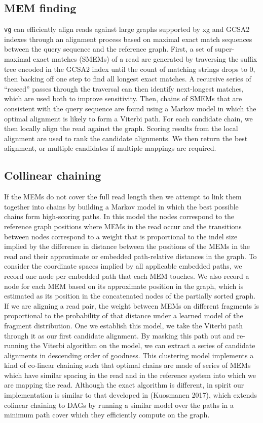 \subsection{MEM finding}
{\tt vg} can efficiently align reads against large graphs supported by xg and GCSA2 indexes through an alignment process based on maximal exact match sequences between the query sequence and the reference graph.
First, a set of super-maximal exact matches (SMEMs) of a read are generated by traversing the suffix tree encoded in the GCSA2 index until the count of matching strings drops to 0, then backing off one step to find all longest exact matches. 
A recursive series of ``reseed'' passes through the traversal can then identify next-longest matches, which are used both to improve sensitivity. 
Then, chains of SMEMs that are consistent with the query sequence are found using a Markov model in which the optimal alignment is likely to form a Viterbi path.
For each candidate chain, we then locally align the read against the graph. 
Scoring results from the local alignment are used to rank the candidate alignments.
We then return the best alignment, or multiple candidates if multiple mappings are required.

\subsection{Collinear chaining}

If the MEMs do not cover the full read length then we attempt to link them together into chains by building a Markov model in which the best possible chains form high-scoring paths. 
In this model the nodes correspond to the reference graph positions where MEMs in the read occur and the transitions between nodes correspond to a weight that is proportional to the indel size implied by the difference in distance between the positions of the MEMs in the read and their approximate or embedded path-relative distances in the graph. 
To consider the coordinate spaces implied by all applicable embedded paths, we record one node per embedded path that each MEM touches. 
We also record a node for each MEM based on its approximate position in the graph, which is estimated as its position in the concatenated nodes of the partially sorted graph. 
If we are aligning a read pair, the weight between MEMs on different fragments is proportional to the probability of that distance under a learned model of the fragment distribution. 
One we establish this model, we take the Viterbi path through it as our first candidate alignment. 
By masking this path out and re-running the Viterbi algorithm on the model, we can extract a series of candidate alignments in descending order of goodness. 
This clustering model implements a kind of co-linear chaining such that optimal chains are made of series of MEMs which have similar spacing in the read and in the reference system into which we are mapping the read. 
Although the exact algorithm is different, in spirit our implementation is similar to that developed in (Kuosmanen 2017), which extends colinear chaining to DAGs by running a similar model over the paths in a minimum path cover which they efficiently compute on the graph.

